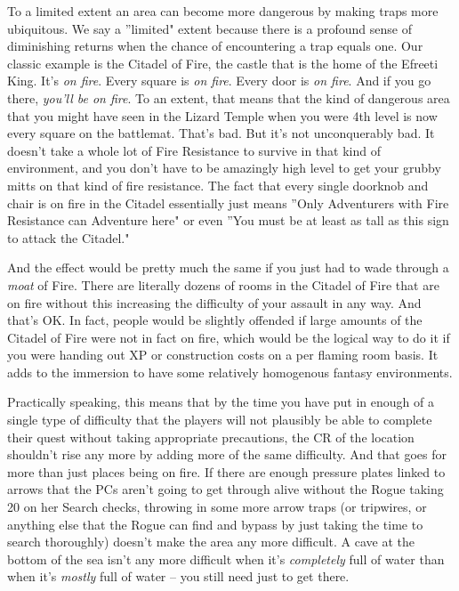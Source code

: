 To a limited extent an area can become more dangerous by making traps more ubiquitous. We say a ''limited" extent because there is a profound sense of diminishing returns when the chance of encountering a trap equals one. Our classic example is the Citadel of Fire, the castle that is the home of the Efreeti King. It's \textit{on fire}. Every square is \textit{on fire}. Every door is \textit{on fire}. And if you go there, \textit{you'll be on fire}. To an extent, that means that the kind of dangerous area that you might have seen in the Lizard Temple when you were 4th level is now every square on the battlemat. That's bad. But it's not unconquerably bad. It doesn't take a whole lot of Fire Resistance to survive in that kind of environment, and you don't have to be amazingly high level to get your grubby mitts on that kind of fire resistance. The fact that every single doorknob and chair is on fire in the Citadel essentially just means ''Only Adventurers with Fire Resistance can Adventure here" or even ''You must be at least as tall as this sign to attack the Citadel."

And the effect would be pretty much the same if you just had to wade through a \textit{moat} of Fire. There are literally dozens of rooms in the Citadel of Fire that are on fire without this increasing the difficulty of your assault in any way. And that's OK. In fact, people would be slightly offended if large amounts of the Citadel of Fire were not in fact on fire, which would be the logical way to do it if you were handing out XP or construction costs on a per flaming room basis. It adds to the immersion to have some relatively homogenous fantasy environments.

Practically speaking, this means that by the time you have put in enough of a single type of difficulty that the players will not plausibly be able to complete their quest without taking appropriate precautions, the CR of the location shouldn't rise any more by adding more of the same difficulty. And that goes for more than just places being on fire. If there are enough pressure plates linked to arrows that the PCs aren't going to get through alive without the Rogue taking 20 on her Search checks, throwing in some more arrow traps (or tripwires, or anything else that the Rogue can find and bypass by just taking the time to search thoroughly) doesn't make the area any more difficult. A cave at the bottom of the sea isn't any more difficult when it's \textit{completely} full of water than when it's \textit{mostly} full of water -- you still need  just to get there.

